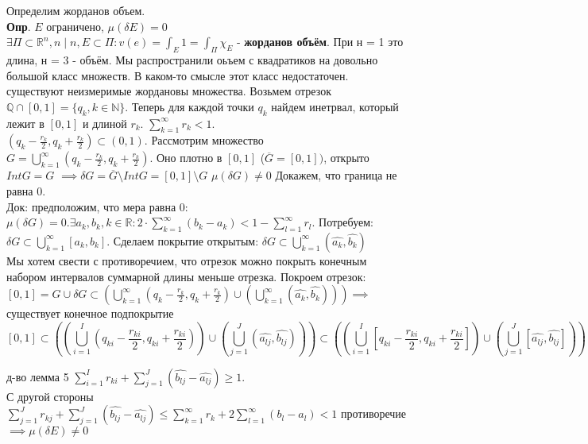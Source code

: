 \documentclass[12pt, a4paper]{article}
\theoremstyle{plain}
\begin{document}
    Определим жорданов объем. \\
    \textbf{Опр}. $E$ ограничено, $\mu(\delta E) = 0$\\
    $\displaystyle\exists \Pi \subset \mathbb{R}^n, n \mid n, E \subset \Pi: v(e) = \int_E 1 = \int_\Pi \chi_E$ - 
    \textbf{жорданов объём}. %
    При н = 1 это длина, н = 3 - объём.
    Мы распространили оьъем с квадратиков на довольно большой класс множеств. 
    В каком-то смысле этот класс недостаточен. существуют неизмеримые жордановы множества.
    Возьмем отрезок $\mathbb{Q} \cap [0,1] = \{q_k, k \in \mathbb{N}\}$. Теперь для каждой точки
    $q_k$ найдем инетрвал, который лежит в $[0,1]$ и длиной $r_k$. $\sum_{k=1}^\infty r_k< 1$.\\
    $(q_k-\frac{r_k}{2}, q_k + \frac{r_k}{2}) \subset (0, 1)$. Рассмотрим множество 
    $G = \bigcup^\infty_{k=1} (q_k-\frac{r_k}{2}, q_k + \frac{r_k}{2})$. Оно плотно в $[0, 1]$ 
    ($\overline{G} = [0, 1])$, открыто $Int G = G$ $\implies \delta G = \overline{G} \setminus Int G = [0, 1] \setminus G$
    $\mu(\delta G) \neq 0$ Докажем, что граница не равна 0.\\
    Док:
    предположим, что мера равна 0: $\mu(\delta G ) = 0. \exists a_k, b_k, k \in \mathbb{R}: 
    2 \cdot \sum_{k=1}^\infty (b_k - a_k) < 1 - \sum_{l=1}^\infty r_l  $. Потребуем:
    $\delta G \subset \bigcup^\infty_{k=1}[a_k, b_k]$. Сделаем покрытие открытым: %
    $\delta G \subset \bigcup^\infty_{k=1}(\hat{a_k},\hat{b_k})$\\
    Мы хотем свести с противоречием, что отрезок можно покрыть конечным набором 
    интервалов суммарной длины меньше отрезка. Покроем отрезок: 
    $[0, 1] = G \cup \delta G \subset \left(\bigcup_{k=1}^\infty (q_k - \frac{r_k}{2}, q_k + \frac{r_k}{2} )\cup (\bigcup_{k=1}^\infty (\hat{a_k}, \hat{b_k})) \right) \implies$
    существует конечное подпокрытие 
    $$\displaystyle 
    [0, 1] \subset\left((\bigcup_{i=1}^I (q_{ki} - \frac{r_{ki}}{2}, q_{ki} + \frac{r_{ki}}{2})) \cup (\bigcup^J_{j=1} (\hat{a_{lj}}, \hat{b_{lj}})) \right) \subset 
    \left( (\bigcup^I_{i=1} [q_{ki} - \frac{r_{ki}}{2}, q_{ki} + \frac{r_{ki}}{2} ]) \cup (\bigcup^J_{j=1}[\hat{a_{lj}}, \hat{b_{lj}}])\right)$$
    
    д-во лемма 5 $\sum^I_{i=1} r_{ki} + \sum^J_{j=1} (\hat{b_{lj}} - \hat{a_{lj}}) \ge 1$. \\
    С другой стороны $\sum^J_{j=1} r_{kj} + \sum^J_{j=1} (\hat{b_{lj}} - \hat{a_{lj}})  \le \sum^\infty_{k=1} r_k + 2 \sum^\infty_{l=1} (b_l - a_l) < 1$
    противоречие $\implies \mu (\delta E) \neq 0$\\
\end{document}
